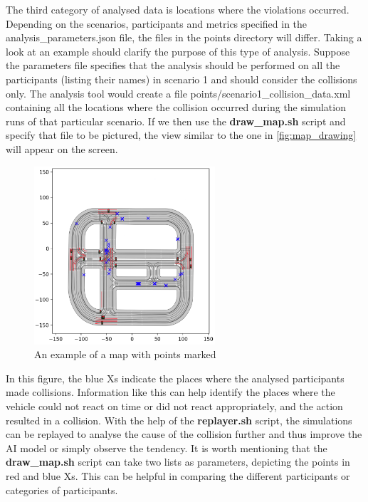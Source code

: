 The third category of analysed data is locations where the violations occurred. Depending on the scenarios, participants and metrics specified in the analysis\_parameters.json file, the files in the points directory will differ. Taking a look at an example should clarify the purpose of this type of analysis. Suppose the parameters file specifies that the analysis should be performed on all the participants (listing their names) in scenario 1 and should consider the collisions only. The analysis tool would create a file points/scenario1\_collision\_data.xml containing all the locations where the collision occurred during the simulation runs of that particular scenario. If we then use the \textbf{draw\_map.sh} script and specify that file to be pictured, the view similar to the one in \autoref{fig:map_drawing} will appear on the screen.

\begin{figure} [h]
    \centering
    \includegraphics[width = 0.6\textwidth]{research_paper/Images/map_drawing.png}
    \caption{An example of a map with points marked}
    \label{fig:map_drawing}
\end{figure}

In this figure, the blue Xs indicate the places where the analysed participants made collisions. Information like this can help identify the places where the vehicle could not react on time or did not react appropriately, and the action resulted in a collision. With the help of the \textbf{replayer.sh} script, the simulations can be replayed to analyse the cause of the collision further and thus improve the AI model or simply observe the tendency. It is worth mentioning that the \textbf{draw\_map.sh} script can take two lists as parameters, depicting the points in red and blue Xs. This can be helpful in comparing the different participants or categories of participants.

